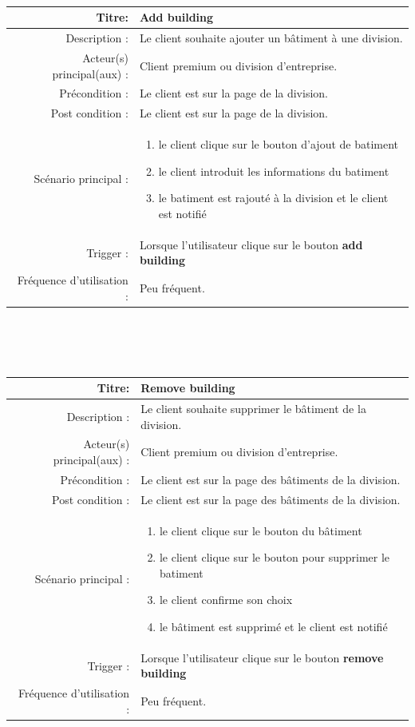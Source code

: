 \documentclass{report}
\begin{document}
\\\\\\
\begin{tabular}{|r|p{9cm}|}
    \hline
    Titre: & Add building \\
    \hline
    Description : & Le client souhaite ajouter un bâtiment à une division. \\
    \hline
    Acteur(s) principal(aux) : & Client premium ou division d'entreprise. \\
    \hline
    Précondition : & Le client est sur la page de la division. \\
    \hline
    Post condition : & Le client est sur la page de la division. \\
    \hline
    Scénario principal : & \begin{enumerate}[left=0pt, topsep=0pt]
        \item le client clique sur le bouton d'ajout de batiment
        \item le client introduit les informations du batiment
        \item le batiment est rajouté à la division et le client est notifié 
    \end{enumerate} \nointerlineskip\\
    \hline
    Trigger : & Lorsque l'utilisateur clique sur le bouton \textbf{add building} \\ 
    \hline
    Fréquence d'utilisation : & Peu fréquent. \\
    \hline
\end{tabular}
\\\\\\
\begin{tabular}{|r|p{9cm}|}
    \hline
    Titre: & Remove building \\
    \hline
    Description : & Le client souhaite supprimer le bâtiment de la division. \\
    \hline
    Acteur(s) principal(aux) : & Client premium ou division d'entreprise. \\
    \hline
    Précondition : & Le client est sur la page des bâtiments de la division. \\
    \hline
    Post condition : & Le client est sur la page des bâtiments de la division. \\
    \hline
    Scénario principal : & \begin{enumerate}[left=0pt, topsep=0pt]
        \item le client clique sur le bouton du bâtiment
        \item le client clique sur le bouton pour supprimer le batiment
        \item le client confirme son choix
        \item le bâtiment est supprimé et le client est notifié 
    \end{enumerate} \nointerlineskip\\
    \hline
    Trigger : & Lorsque l'utilisateur clique sur le bouton \textbf{remove building} \\ 
    \hline
    Fréquence d'utilisation : & Peu fréquent. \\
    \hline
\end{tabular}
\end{document}
